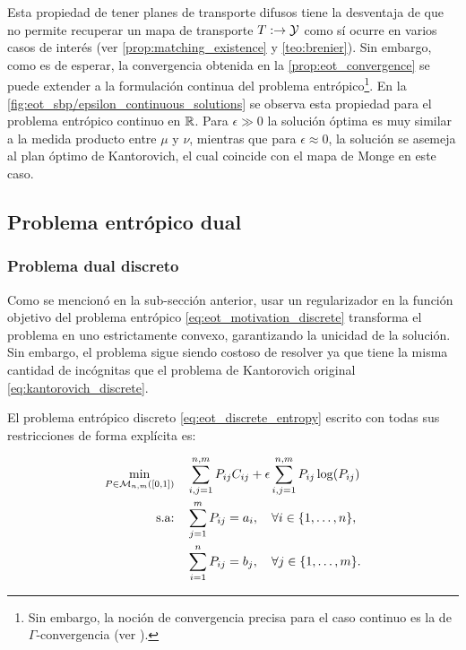 Esta propiedad de tener planes de transporte difusos tiene la desventaja de que no permite recuperar un mapa de transporte $T:\to\mathcal{Y}$ como sí ocurre en varios casos de interés (ver \autoref{prop:matching_existence} y \autoref{teo:brenier}). Sin embargo, como es de esperar, la convergencia obtenida en la \autoref{prop:eot_convergence} se puede extender a la formulación continua del problema entrópico\footnote{Sin embargo, la noción de convergencia precisa para el caso continuo es la de $\Gamma$-convergencia (ver \cite{léonard2013survey}).}. En la \autoref{fig:eot_sbp/epsilon_continuous_solutions} se observa esta propiedad para el problema entrópico continuo en $\mathbb{R}$. Para $\epsilon\gg0$ la solución óptima es muy similar a la medida producto entre $\mu$ y $\nu$, mientras que para $\epsilon\approx 0$, la solución se asemeja al plan óptimo de Kantorovich, el cual coincide con el mapa de Monge en este caso.


\subsection{Problema entrópico dual}
\label{eot_sbp/regularized/eot_dual}

\subsubsection{Problema dual discreto}

Como se mencionó en la sub-sección anterior, usar un regularizador en la función objetivo del problema entrópico \eqref{eq:eot_motivation_discrete} transforma el problema en uno estrictamente convexo, garantizando la unicidad de la solución. Sin embargo, el problema sigue siendo costoso de resolver ya que tiene la misma cantidad de incógnitas que el problema de Kantorovich original \eqref{eq:kantorovich_discrete}.

El problema entrópico discreto \eqref{eq:eot_discrete_entropy} escrito con todas sus restricciones de forma explícita es:

\begin{align}
	\min_{P\in\mathcal{M}_{n,m}\left([0,1]\right)} \quad & \sum_{i,j=1}^{n,m} P_{ij}C_{ij} + \epsilon\sum_{i,j=1}^{n,m} P_{ij}\log(P_{ij}) \\
	\text{s.a:} \quad                         & \sum_{j=1}^m P_{ij} = a_i,\quad \forall i\in\{1,\ldots,n\},                     \\
	                                          & \sum_{i=1}^n P_{ij} = b_j,\quad \forall j\in\{1,\ldots,m\}.
\end{align}

